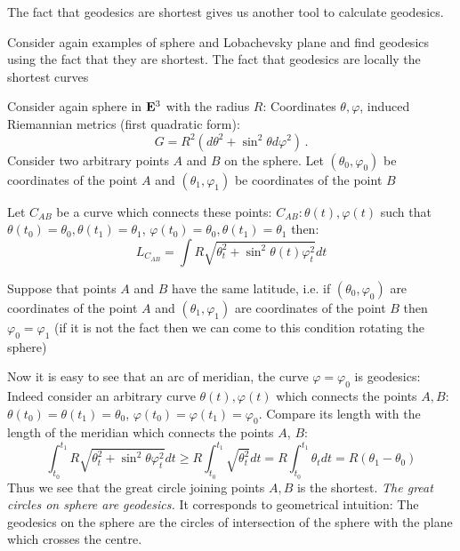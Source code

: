 \documentclass[12pt]{article}
\theoremstyle{theorem}
\numberwithin{equation}{section}
\begin{document}
{The fact that geodesics are shortest gives us another tool to calculate geodesics.

Consider again examples of sphere and Lobachevsky plane and find geodesics using the fact that they are shortest.
The fact that geodesics are locally the shortest curves

\m


Consider  again sphere in ${\bf E}^3$ with the radius $R$:
  Coordinates $\theta,\varphi$, induced Riemannian metrics (first quadratic form):
\begin{equation}\label{metricsonsphere5}
  G=R^2(d\theta^2+\sin^2\theta d\varphi^2)\,.
\end{equation}
Consider two arbitrary points $A$ and $B$ on  the sphere.
Let $(\theta_0,\varphi_0)$ be coordinates
  of the point $A$ and $(\theta_1,\varphi_1)$ be coordinates
  of the point $B$


 Let $C_{AB}$ be a curve which connects these points:
   $C_{AB}\colon \theta(t),\varphi(t)$ such that
    $\theta(t_0)=\theta_0, \theta(t_1)=\theta_1$,
    $\varphi(t_0)=\theta_0, \theta(t_1)=\theta_1$
  then:
\begin{equation}\label{lengthonsphere5}
  L_{C_{AB}}=\int R\sqrt {\theta_t^2+\sin^2\theta(t)\varphi_t^2}dt
\end{equation}

  Suppose that points $A$ and $B$
  have the same latitude, i.e.
  if $(\theta_0,\varphi_0)$ are coordinates
  of the point $A$ and $(\theta_1,\varphi_1)$ are coordinates
  of the point $B$ then $\varphi_0=\varphi_1$
  (if it is not the fact then we can come to this condition rotating the sphere)

Now it is easy to see that an arc of meridian, the  curve $\varphi=\varphi_0$ is geodesics:
Indeed consider an arbitrary curve $\theta (t),\varphi(t)$
which connects the points $A,B$:
$\theta(t_0)=\theta(t_1)=\theta_0$,
$\varphi(t_0)=\varphi(t_1)=\varphi_0$.
Compare its length with the length
of the meridian which connects the points $A$, $B$:
\begin{equation}\label{geodforsphereap}
\int_{t_0}^{t_1} R\sqrt {\theta_t^2+\sin^2\theta\varphi_t^2}dt\geq
R\int_{t_0}^{t_1} \sqrt {\theta_t^2}dt=R\int_{t_0}^{t_1} {\theta_t}dt=
R(\theta_1-\theta_0)
\end{equation}
Thus we see that  the great circle joining points $A,B$ is the shortest.
{\it The great circles on sphere are geodesics.}
 It corresponds to geometrical intuition:
     The geodesics on the sphere are the circles of intersection of the sphere
     with the plane which crosses the centre.


}
\end{document}
